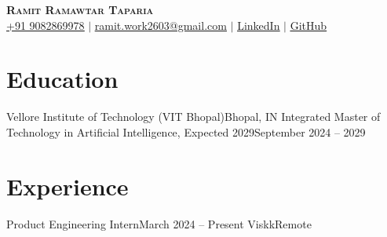 \newcommand{\resumeProjectHeading}[2]{
    \item
    \begin{tabular*}{0.97\textwidth}{l@{\extracolsep{\fill}}r}
      \small#1 & #2 \\
    \end{tabular*}\vspace{-7pt}
}

\newcommand{\resumeSubItem}[1]{\resumeItem{#1}\vspace{-4pt}}

\renewcommand\labelitemii{$\vcenter{\hbox{\tiny$\bullet$}}$}

\newcommand{\resumeSubHeadingListStart}{\begin{itemize}[leftmargin=0.15in, label={}]}
\newcommand{\resumeSubHeadingListEnd}{\end{itemize}}
\newcommand{\resumeItemListStart}{\begin{itemize}}
\newcommand{\resumeItemListEnd}{\end{itemize}\vspace{-5pt}}




\begin{center}
    \textbf{\Huge \scshape Ramit Ramawtar Taparia} \\ \vspace{1pt}
    \href{tel:+919082869978}{\underline{+91 9082869978}} $|$ \href{mailto:ramit.work2603@gmail.com}{\underline{ramit.work2603@gmail.com}} $|$ 
    \href{https://www.linkedin.com/in/ramit-taparia/}{\underline{LinkedIn}} $|$
    \href{https://github.com/foundRamit}{\underline{GitHub}}
\end{center}

\section{Education}
  \resumeSubHeadingListStart
    \resumeSubheading
      {Vellore Institute of Technology (VIT Bhopal)}{Bhopal, IN}
      {Integrated Master of Technology in Artificial Intelligence, Expected 2029}{September 2024 -- 2029}
  \resumeSubHeadingListEnd

\section{Experience}
  \resumeSubHeadingListStart
   \resumeSubheading
      {Product Engineering Intern}{March 2024 -- Present}
      {Viskk}{Remote}
      \resumeItemListStart
      \resumeItemListEnd
  \resumeSubHeadingListEnd

